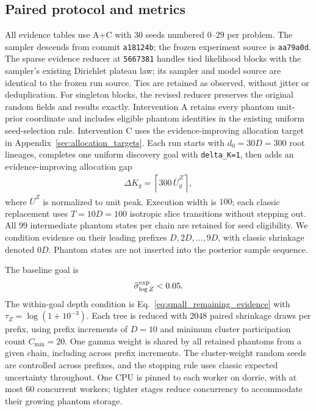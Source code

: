 \documentclass[pdflatex,sn-basic,icol]{sn-jnl}
\theoremstyle{plain}
\theoremstyle{definition}
\begin{document}
\subsection{Paired protocol and metrics}

All evidence tables use A+C with $30$ seeds numbered $0$--$29$ per problem.
The sampler descends from commit \texttt{a18124b}; the frozen experiment source is \texttt{aa79a0d}.
The sparse evidence reducer at \texttt{5667381} handles tied likelihood blocks with the sampler's existing Dirichlet plateau law; its sampler and model source are identical to the frozen run source.
Ties are retained as observed, without jitter or deduplication. For singleton blocks, the revised reducer preserves the original random fields and results exactly.
Intervention A retains every phantom unit-prior coordinate and includes eligible phantom identities in the existing uniform seed-selection rule.
Intervention C uses the evidence-improving allocation target in Appendix~\ref{sec:allocation_targets}.
Each run starts with $d_0=30D=300$ root lineages, completes one uniform discovery goal with \texttt{delta\_K=1}, then adds an evidence-improving allocation gap
\begin{align}
    \Delta K_g=\left\lceil300\,\overline U^Z_g\right\rceil,
\end{align}
where $\overline U^Z$ is normalized to unit peak.
Execution width is $100$; each classic replacement uses $T=10D=100$ isotropic slice transitions without stepping out.
All $99$ intermediate phantom states per chain are retained for seed eligibility.
We condition evidence on their leading prefixes $D,2D,\ldots,9D$, with classic shrinkage denoted $0D$.
Phantom states are not inserted into the posterior sample sequence.

The baseline goal is
\begin{align}
    \widehat\sigma^{\rm exp}_{\log Z}<0.05.\label{eq:benchmark_goal}
\end{align}
The within-goal depth condition is Eq.~\ref{eq:small_remaining_evidence} with $\tau_Z=\log(1+10^{-3})$.
Each tree is reduced with $2048$ paired shrinkage draws per prefix, using prefix increments of $D=10$ and minimum cluster participation count $C_{\min}=20$.
One gamma weight is shared by all retained phantoms from a given chain, including across prefix increments.
The cluster-weight random seeds are controlled across prefixes, and the stopping rule uses classic expected uncertainty throughout.
One CPU is pinned to each worker on dorrie, with at most $60$ concurrent workers; tighter stages reduce concurrency to accommodate their growing phantom storage.
\end{document}
